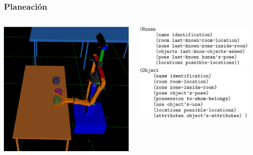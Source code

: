 \documentclass[10pt,spanish,aspectratio=1610]{beamer}
\begin{document}
\begin{frame}\frametitle{Planeación}
  \centering
  \begin{columns}
    \begin{column}{0.25\textwidth}
      \includegraphics[width=\textwidth]{Figures/Planning1.jpg}\\
    \end{column}
    \begin{column}{0.35\textwidth}
      \includegraphics[scale=0.7]{Figures/PlanningCD3.jpg}\\
      \includegraphics[scale=0.7]{Figures/PlanningCD4.jpg}
    \end{column}

\end{columns}
\end{frame}
\end{document}

